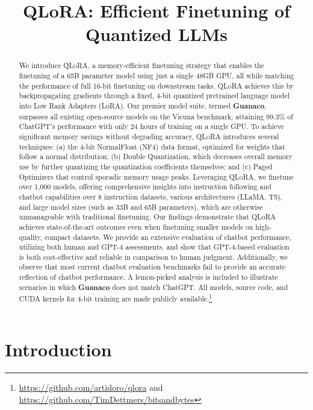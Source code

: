 \title{QLoRA: Efficient Finetuning of Quantized LLMs}

\begin{abstract}
We introduce \textsc{QLoRA}, a memory-efficient finetuning strategy that enables the finetuning of a 65B parameter model using just a single 48GB GPU, all while matching the performance of full 16-bit finetuning on downstream tasks. \textsc{QLoRA} achieves this by backpropagating gradients through a fixed, 4-bit quantized pretrained language model into Low Rank Adapters (LoRA). Our premier model suite, termed \textbf{Guanaco}, surpasses all existing open-source models on the Vicuna benchmark, attaining 99.3\% of ChatGPT's performance with only 24 hours of training on a single GPU. To achieve significant memory savings without degrading accuracy, \textsc{QLoRA} introduces several techniques: (a) the 4-bit NormalFloat (NF4) data format, optimized for weights that follow a normal distribution; (b) Double Quantization, which decreases overall memory use by further quantizing the quantization coefficients themselves; and (c) Paged Optimizers that control sporadic memory usage peaks. Leveraging \textsc{QLoRA}, we finetune over 1,000 models, offering comprehensive insights into instruction following and chatbot capabilities over 8 instruction datasets, various architectures (LLaMA, T5), and large model sizes (such as 33B and 65B parameters), which are otherwise unmanageable with traditional finetuning. Our findings demonstrate that QLoRA achieves state-of-the-art outcomes even when finetuning smaller models on high-quality, compact datasets. We provide an extensive evaluation of chatbot performance, utilizing both human and GPT-4 assessments, and show that GPT-4-based evaluation is both cost-effective and reliable in comparison to human judgment. Additionally, we observe that most current chatbot evaluation benchmarks fail to provide an accurate reflection of chatbot performance. A lemon-picked analysis is included to illustrate scenarios in which \textbf{Guanaco} does not match ChatGPT. All models, source code, and CUDA kernels for 4-bit training are made publicly available.\footnote{\url{https://github.com/artidoro/qlora} and \url{https://github.com/TimDettmers/bitsandbytes}}
\end{abstract}

\section{Introduction}

